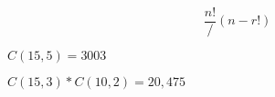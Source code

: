 \documentclass[10pt]{book}
\begin{document}
\begin{mdSnippets}
\newcommand{\jacobi}[2]{\ensuremath{\left(\frac{#1}{#2}\right)}}

\begin{mdDisplaySnippet}%
\[%
\frac {n!} / {(n-r!)}
\]%
\end{mdDisplaySnippet}%
\begin{mdInlineSnippet}%
$C(15,5) = 3003$\end{mdInlineSnippet}%
\begin{mdInlineSnippet}[775aa9f7cc0de1e014b3e4955b2f4fd5]%
$C(15,3) * C(10,2) = 20,475$\end{mdInlineSnippet}%

\end{mdSnippets}
\end{document}
